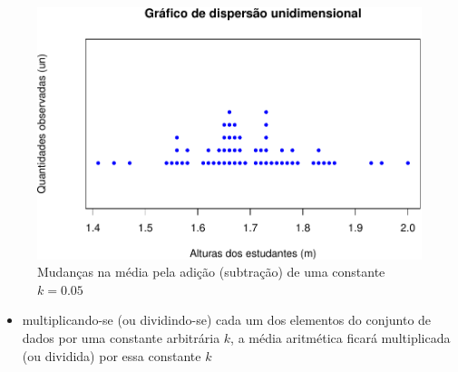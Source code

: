 \documentclass[
]{book}
\providecommand{\tightlist}{%
  \setlength{\itemsep}{0pt}\setlength{\parskip}{0pt}}
\begin{document}
\begin{figure}

{\centering \includegraphics{apostila_files/figure-latex/unnamed-chunk-19-1} 

}

\caption{Mudanças na média pela adição (subtração) de uma constante $k=0.05$}\label{fig:unnamed-chunk-19}
\end{figure}

\hfill\break

\begin{itemize}
\tightlist
\item
  multiplicando-se (ou dividindo-se) cada um dos elementos do conjunto de dados por uma constante arbitrária \(k\), a média aritmética ficará multiplicada (ou dividida) por essa constante \(k\)
\end{itemize}

\hfill\break
\end{document}

